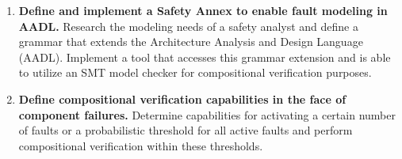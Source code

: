 \begin{enumerate}
\item \textbf{Define and implement a Safety Annex to enable fault modeling in AADL.} Research the modeling needs of a safety analyst and define a grammar that extends the Architecture Analysis and Design Language (AADL). Implement a tool that accesses this grammar extension and is able to utilize an SMT model checker for compositional verification purposes.


\item \textbf{Define compositional verification capabilities in the face of component failures.} Determine capabilities for activating a certain number of faults or a probabilistic threshold for all active faults and perform compositional verification within these thresholds.



\end{enumerate}
